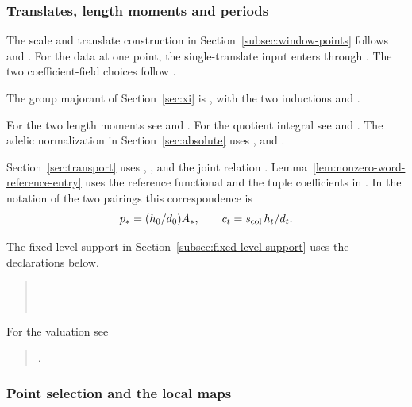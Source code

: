 \subsubsection{Translates, length moments and periods}
The scale and translate construction in
Section~\ref{subsec:window-points} follows  and
. For the data at one point, the single-translate input enters through
. The two coefficient-field
choices follow .
\cite{release-window-design,release-window-objects,release-window-two-pass}

The group majorant of Section~\ref{sec:xi} is
, with the two inductions
 and .
\cite{release}

For the two length moments see 
and . For the quotient integral see
 and .
The adelic normalization in Section~\ref{sec:absolute} uses
,  and
. \cite{release}

Section~\ref{sec:transport} uses ,
,  and the joint relation
. Lemma~\ref{lem:nonzero-word-reference-entry} uses the reference
functional and the tuple coefficients in
\href{https://github.com/Deicyde/riemann-hypothesis/blob/a172c464fd4bcfc4f53e394dcba45d742b1409a6/src/Development/AutomorphicArithmetic/ThetaCorrespondence/ThetaPairLifts/ThirdPlaceSeries/RelOfLinks.lean\#L30-L51}{}.
In the notation of the two pairings this correspondence is
\[
     p_*=(h_0/d_0) A_*,\qquad c_t=s_{\rm col}\,h_t/d_t .
\]

The fixed-level support in Section~\ref{subsec:fixed-level-support}
uses the declarations below. \cite{release-fixed-level-support}
\begin{quote}
\\
\\
\end{quote}
For the valuation see
\begin{quote}
.
\end{quote}
\cite{release}

\subsubsection{Point selection and the local maps}

